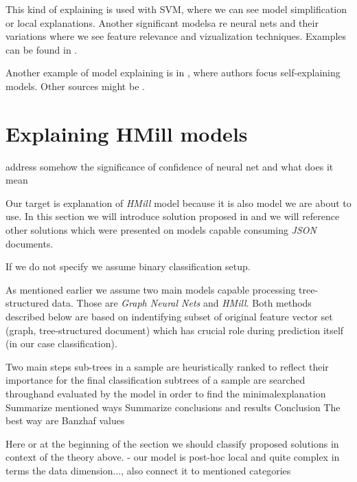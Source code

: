 This kind of explaining is used with SVM, where we can see model simplification or local explanations. Another significant modelsa re neural nets and their variations where we see feature relevance and vizualization techniques. Examples can be found in \cite{Arrieta2019}.

Another example of model explaining is in \cite{Alvarez-Melis2018}, where authors focus self-explaining models. Other sources might be \cite{Strumbelj2013,Robnik-Sikonja2008,Montavon2018}.


\section{Explaining HMill models}
address somehow the significance of confidence of neural net and what does it mean


Our target is explanation of \emph{HMill} model because it is also model we are about to use. In this section we will introduce solution proposed in \cite{Pevny2020} and we will reference other solutions which were presented on models capable consuming \emph{JSON} documents.

If we do not specify we assume binary classification setup.

As mentioned earlier we assume two main models capable processing tree-structured data. Those are \emph{Graph Neural Nets} and \emph{HMill}. Both methods described below are based on indentifying subset of original feature vector set (graph, tree-structured document) which has crucial role during prediction itself (in our case classification). 


Two main steps
    sub-trees in a sample are heuristically ranked to reflect their importance for the final classification
    subtrees of a sample are searched throughand evaluated by the model in order to find the minimalexplanation
Summarize mentioned ways
Summarize conclusions and results
    Conclusion The best way are Banzhaf values

Here or at the beginning of the section we should classify proposed solutions in context of the theory above. - our model is post-hoc local and quite complex in terms the data dimension..., also connect it to mentioned categories

